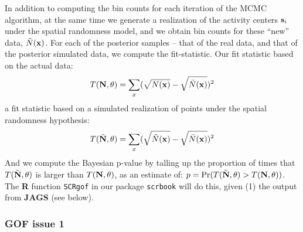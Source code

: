 In addition to computing the bin counts for each iteration of the MCMC
algorithm, at the same time we generate a realization of the activity
centers ${\bf s}_{i}$ under the spatial randomness model, and we
obtain bin counts for these ``new'' data, $\tilde{N}({\bf x})$. For each of
the posterior samples -- that of the real data, and that of the
posterior simulated data, we compute the fit-statistic.  Our fit
statistic based on the actual data:
\[
T({\bf N},\theta) = \sum_{x}  (\sqrt{N({\bf x})} - \sqrt{ \bar{N}({\bf x})})^2
\]
a fit statistic based on a simulated realization of points under the
spatial randomness hypothesis:
\[
T(\tilde{\bf N},\theta) = \sum_{x}  (\sqrt{\tilde{N}({\bf x})} - \sqrt{
  \bar{N}({\bf x})})^2
\]
And we compute the Bayesian p-value by talling up the proportion of
times that 
$T(\tilde{\bf N},\theta)$
is larger than $T({\bf N},\theta)$, as an estimate of:
$p = \Pr(T(\tilde{\bf N},\theta) > T({\bf N},\theta))$.
The {\bf R} function 
 {\tt SCRgof} in our package \mbox{\tt scrbook} will do this, given 
(1) the output from {\bf JAGS} (see below).




\subsubsection{GOF issue 1}

